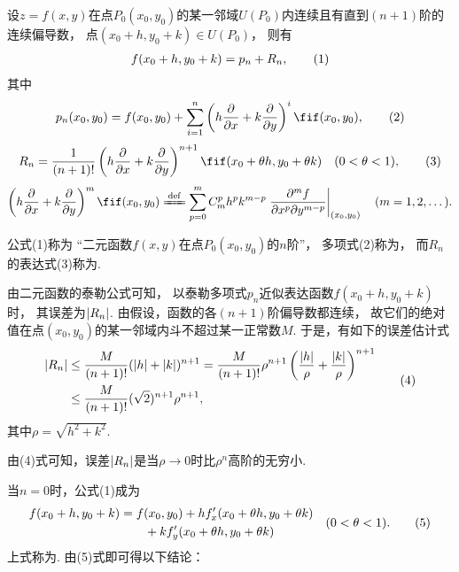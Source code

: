 \begin{theorem}\label{theorem:多元函数微分法.二元函数的泰勒公式}
\def\oprt#1{%
	\left(h\pdv{x}+k\pdv{y}\right)%
	\ifx\relax#1\relax\else\ifnum1=0#1\relax\else^{#1}\fi\fi%
}
设\(z=f(x,y)\)在点\(P_0(x_0,y_0)\)的某一邻域\(U(P_0)\)内连续且有直到\((n+1)\)阶的连续偏导数，
点\((x_0+h,y_0+k) \in U(P_0)\)，
则有\begin{gather}
	f(x_0+h,y_0+k) = p_n + R_n,
	\tag1
\end{gather}
其中\begin{gather}\label{equation:多元函数微分法.二元函数的泰勒多项式}
	p_n(x_0,y_0)
	=f(x_0,y_0)
	+ \sum_{i=1}^n \oprt{i} f(x_0,y_0),
	\tag2
\end{gather}
\begin{gather}\label{equation:多元函数微分法.二元函数的泰勒公式的拉格朗日型余项}
	R_n = \frac{1}{(n+1)!} \oprt{n+1} f(x_0+\theta h,y_0+\theta k)
	\quad (0 < \theta < 1),
	\tag3
\end{gather}
\[
	\oprt{m} f(x_0,y_0)
	\defeq
	\sum\limits_{p=0}^{m} C_m^p h^p k^{m-p}
		\eval{
			\frac{\partial^m f}{\partial x^p \partial y^{m-p}}
		}_{(x_0,y_0)}
	\quad(m=1,2,\dotsc).
\]

\rm
公式(1)称为
“二元函数\(f(x,y)\)在点\(P_0(x_0,y_0)\)的\(n\)阶”，
多项式(2)称为，
而\(R_n\)的表达式(3)称为.
\end{theorem}
由二元函数的泰勒公式可知，
以泰勒多项式\(p_n\)近似表达函数\(f(x_0+h,y_0+k)\)时，
其误差为\(\abs{R_n}\).
由假设，函数的各\((n+1)\)阶偏导数都连续，
故它们的绝对值在点\((x_0,y_0)\)的某一邻域内斗不超过某一正常数\(M\).
于是，有如下的误差估计式\begin{gather}
	\begin{split}
		\abs{R_n}
		&\leq \frac{M}{(n+1)!} (\abs{h}+\abs{k})^{n+1}
		= \frac{M}{(n+1)!} \rho^{n+1}
			\left( \frac{\abs{h}}{\rho} + \frac{\abs{k}}{\rho} \right)^{n+1} \\
		&\leq \frac{M}{(n+1)!} (\sqrt{2})^{n+1} \rho^{n+1},
	\end{split}
	\tag4
\end{gather}其中\(\rho=\sqrt{h^2+k^2}\).

由(4)式可知，误差\(\abs{R_n}\)是当\(\rho\to0\)时比\(\rho^n\)高阶的无穷小.

当\(n=0\)时，公式(1)成为
\begin{gather}\label{equation:多元函数微分法.二元函数的拉格朗日中值公式}
	\begin{split}
		f(x_0+h,y_0+k)
		&=f(x_0,y_0)
		+h f'_x(x_0+\theta h,y_0+\theta k) \\
		&\hspace{20pt}+k f'_y(x_0+\theta h,y_0+\theta k)
	\end{split}
	\quad(0<\theta<1).
	\tag5
\end{gather}上式称为.
由(5)式即可得以下结论：

